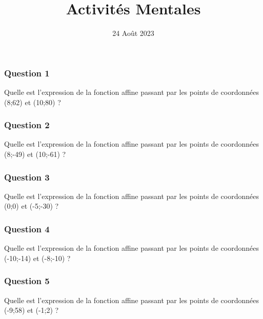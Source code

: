 \documentclass[15pt, mathserif]{beamer}
\title{Activités Mentales}
\date{24 Août 2023}
\begin{document}
\begin{frame}
    \titlepage
\end{frame}

\begin{frame} 
	\frametitle{Question 1}
Quelle est l'expression de la fonction affine passant par les points de coordonnées (8;62) et (10;80) ?\end{frame}


\begin{frame} 
	\frametitle{Question 2}
Quelle est l'expression de la fonction affine passant par les points de coordonnées (8;-49) et (10;-61) ?\end{frame}


\begin{frame} 
	\frametitle{Question 3}
Quelle est l'expression de la fonction affine passant par les points de coordonnées (0;0) et (-5;-30) ?\end{frame}


\begin{frame} 
	\frametitle{Question 4}
Quelle est l'expression de la fonction affine passant par les points de coordonnées (-10;-14) et (-8;-10) ?\end{frame}


\begin{frame} 
	\frametitle{Question 5}
Quelle est l'expression de la fonction affine passant par les points de coordonnées (-9;58) et (-1;2) ?\end{frame}
\end{document}
